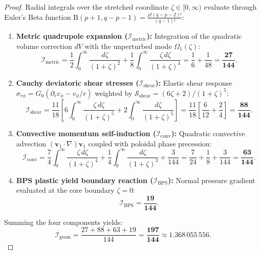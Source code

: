 \documentclass[12pt,a4paper]{article}
\begin{document}
	\begin{proof}
		Radial integrals over the stretched coordinate $\zeta \in [0, \infty)$ evaluate through Euler's Beta function $\mathrm{B}(p+1, q-p-1) = \frac{p!(q-p-2)!}{(q-1)!}$:
		\begin{enumerate}
			\item \textbf{Metric quadrupole expansion ($\mathcal{I}_{\mathrm{metric}}$):}
			Integration of the quadratic volume correction $dV$ with the unperturbed mode $\Omega_1(\zeta)$:
			\begin{equation}
				\mathcal{I}_{\text{metric}} = \frac{1}{2}\int_0^\infty \frac{d\zeta}{(1+\zeta)^2} + \frac{1}{8}\int_0^\infty \frac{\zeta \, d\zeta}{(1+\zeta)^4} = \frac{1}{6} + \frac{1}{48} = \mathbf{\frac{27}{144}}.
			\end{equation}
			
			\item \textbf{Cauchy deviatoric shear stresses ($\mathcal{I}_{\mathrm{shear}}$):}
			Elastic shear response $\sigma_{r\phi} = G_0 (\partial_r v_\phi - v_\phi/r)$ weighted by $\mathcal{S}_{\text{shear}} = (6\zeta + 2)/(1+\zeta)^5$:
			\begin{equation}
				\mathcal{I}_{\text{shear}} = \frac{11}{18} \left[ 6 \int_0^\infty \frac{\zeta \, d\zeta}{(1+\zeta)^5} + 2 \int_0^\infty \frac{d\zeta}{(1+\zeta)^5} \right] = \frac{11}{18} \left[ \frac{6}{12} + \frac{2}{4} \right] = \mathbf{\frac{88}{144}}.
			\end{equation}
			
			\item \textbf{Convective momentum self-induction ($\mathcal{I}_{\mathrm{conv}}$):}
			Quadratic convective advection $(\mathbf{v}_1 \cdot \nabla)\mathbf{v}_1$ coupled with poloidal phase precession:
			\begin{equation}
				\mathcal{I}_{\text{conv}} = \frac{7}{4}\int_0^\infty \frac{\zeta \, d\zeta}{(1+\zeta)^4} + \frac{1}{4}\int_0^\infty \frac{d\zeta}{(1+\zeta)^3} + \frac{3}{144} = \frac{7}{24} + \frac{1}{8} + \frac{3}{144} = \mathbf{\frac{63}{144}}.
			\end{equation}
			
			\item \textbf{BPS plastic yield boundary reaction ($\mathcal{I}_{\mathrm{BPS}}$):}
			Normal pressure gradient evaluated at the core boundary $\zeta=0$:
			\begin{equation}
				\mathcal{I}_{\text{BPS}} = \mathbf{\frac{19}{144}}.
			\end{equation}
		\end{enumerate}
		Summing the four components yields:
		\begin{equation}
			\mathcal{I}_{\text{geom}} = \frac{27 + 88 + 63 + 19}{144} = \mathbf{\frac{197}{144}} \approx 1.368\,055\,556.
		\end{equation}
	\end{proof}
	
\end{document}
